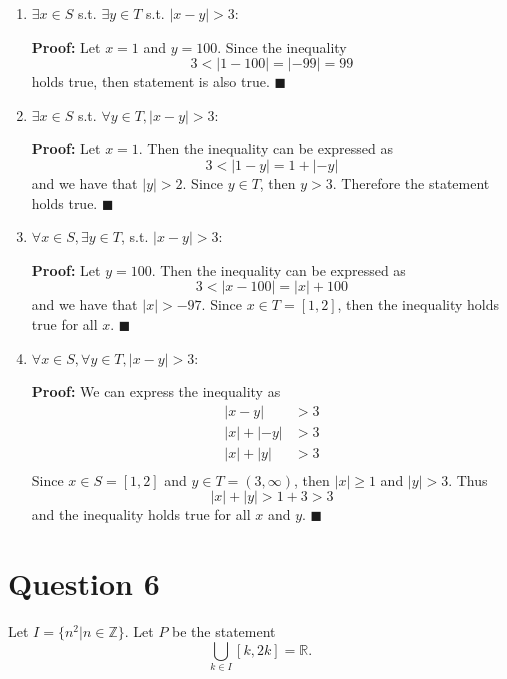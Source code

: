 \documentclass[11pt, oneside]{article}   	%
\newcommand*{\QEDA}{\hfill\ensuremath{\blacksquare}}         %
\begin{document}
\begin{enumerate}[ (a)]    
	\item $\exists x \in S$ s.t. $\exists y \in T$ s.t. $|x-y|> 3$: 
	
	\textbf{Proof:} Let $x=1$ and $y=100$. Since the inequality
	$$3 < |1-100| = |-99| = 99$$
	holds true, then statement is also true. \QEDA
	
	\item $\exists x \in S$ s.t. $\forall y \in T, |x-y| > 3$: 
	
	\textbf{Proof:} Let $x=1$. Then the inequality can be expressed as
	$$3 < |1-y| = 1+ |-y| $$
	and we have that $|y| > 2$. Since $y \in T$, then $y > 3$. Therefore the statement holds true. \QEDA
	
	\item $\forall x \in S, \exists y \in T$, s.t. $|x-y| > 3$: 
	
	\textbf{Proof:} Let $y=100$. Then the inequality can be expressed as
	$$3 < |x-100| = |x| + 100 $$
	and we have that $|x| > -97$. Since $x \in T=[1,2]$, then the inequality holds true for all $x$. \QEDA
	
	\item $\forall x \in S, \forall y \in T, |x-y| > 3$: 
	
	\textbf{Proof:} We can express the inequality as
	\begin{align*}
		|x-y| & > 3 \\
		|x| + |-y| & > 3 \\
		|x| + |y| & > 3 \\
	\end{align*}
	Since $x \in S =[1,2]$ and $y \in T=(3, \infty)$, then $|x| \geq 1$ and $|y| > 3$. Thus
	$$|x| + |y| > 1+3 > 3$$
	and the inequality holds true for all $x$ and $y$. \QEDA

\end{enumerate}

\section*{Question 6}

Let $I=\{n^2 | n \in \mathbb{Z} \}$. Let $P$ be the statement
$$\bigcup_{k \in I} [k,2k]= \mathbb{R}.$$
\end{document}
